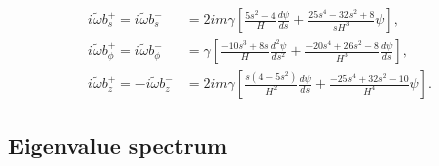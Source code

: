 \begin{equation}
\begin{aligned}
    i \widetilde{\omega} b^{+}_{s} = i \widetilde{\omega} b_s^- &= 2im \gamma \left[\frac{5 s^{2} - 4}{H} \frac{d\psi}{d s} + \frac{25 s^{4} - 32 s^{2} + 8}{sH^{3}} \psi\right], \\
    i \widetilde{\omega} b^{+}_{\phi} = i\widetilde{\omega} b_\phi^- &= \gamma \left[\frac{- 10 s^{3} + 8 s}{H} \frac{d^{2}\psi}{d s^{2}} + \frac{- 20 s^{4} + 26 s^{2} - 8}{H^{3}} \frac{d\psi}{d s}\right], \\
    i \widetilde{\omega} b^{+}_{z} = -i\widetilde{\omega} b_z^- &= 2im \gamma \left[\frac{s \left(4 - 5 s^{2}\right)}{H^{2}} \frac{d\psi}{d s} + \frac{- 25 s^{4} + 32 s^{2} - 10}{H^{4}} \psi\right].
\end{aligned}
\end{equation}


\subsection{Eigenvalue spectrum}

